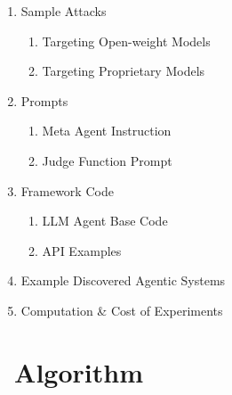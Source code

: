 {\begin{enumerate}
\begin{enumerate}
  \end{enumerate}
  \item[\ref{appx: sample attacks}] Sample Attacks
  \begin{enumerate}
      \item[\ref{appx: sample attack for open-weight models}] Targeting Open-weight Models
      \item[\ref{appx: sample attack for proprietary models}] Targeting Proprietary Models
  \end{enumerate}
  \item[\ref{appx: prompts}] Prompts
  \begin{enumerate}
      \item[\ref{appx: meta agent instruction}] Meta Agent Instruction
      \item[\ref{appx: judge function prompt}] Judge Function Prompt
  \end{enumerate}
  \item[\ref{appx: framework code}] Framework Code
  \begin{enumerate}
      \item[\ref{appx: LLM Agent Base Code}] LLM Agent Base Code
      \item[\ref{appx: api examples}] API Examples
  \end{enumerate}
  \item[\ref{appx: example discovered agentic systems}] Example Discovered Agentic Systems
  \item[\ref{appx: compuation}] Computation \& Cost of Experiments
\end{enumerate}
}
 

\clearpage

\section{\method~Algorithm}
\label{appx: agenticred algorithm}

